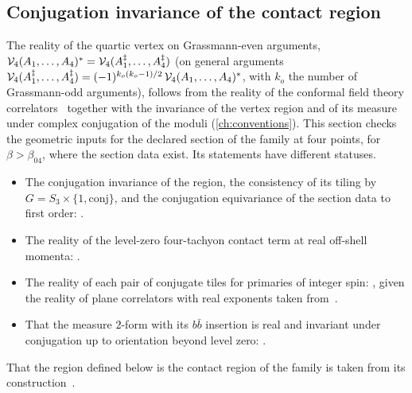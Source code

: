 \subsection{Conjugation invariance of the contact region}
\label{sec:sl2c:conj}

The reality of the quartic vertex on Grassmann-even arguments, $\mathcal{V}_{4}(A_1, \ldots, A_4)^* = \mathcal{V}_{4}(A_1^\ddagger, \ldots, A_4^\ddagger)$ (on general arguments $\mathcal{V}_{4}(A_1^\ddagger, \ldots, A_4^\ddagger) = (-1)^{k_o (k_o - 1) / 2} \, \mathcal{V}_{4}(A_1, \ldots, A_4)^*$, with $k_o$ the number of Grassmann-odd arguments), follows from the reality of the conformal field theory correlators~\cite{Sonoda:1990:CovariantClosedString} together with the invariance of the vertex region and of its measure under complex conjugation of the moduli (\cref{ch:conventions}).
This section checks the geometric inputs for the declared section of the family at four points, for $\beta > \beta_{04}$, where the section data exist.
Its statements have different statuses.
\begin{itemize}
  \item The conjugation invariance of the region, the consistency of its tiling by $G = S_3 \times \{ 1, \mathrm{conj} \}$, and the conjugation equivariance of the section data to first order: .
  \item The reality of the level-zero four-tachyon contact term at real off-shell momenta: .
  \item The reality of each pair of conjugate tiles for primaries of integer spin: , given the reality of plane correlators with real exponents taken from~\cite{Sonoda:1990:CovariantClosedString}.
  \item That the measure $2$-form with its $b \bar b$ insertion is real and invariant under conjugation up to orientation beyond level zero: .
\end{itemize}
That the region defined below is the contact region of the family is taken from its construction~\cite{Erbin:2023:SL2CQuarticVertex, Erbin:2026:SL2CVerticesClosed}.

